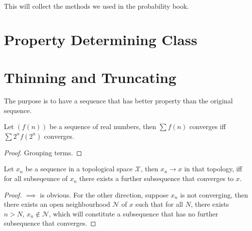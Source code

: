 This will collect the methods we used in the probability book.

\section{Property Determining Class}

\begin{method}
    
\end{method}

\begin{method}
    
\end{method}

\begin{method}
    
\end{method}


\begin{method}
    
\end{method}

\begin{method}
    
\end{method}

\section{Thinning and Truncating}

The purpose is to have a sequence that has better property than the original sequence. 

\begin{method}
    Let \((f(n))\) be a  sequence of real numbers, then \(\sum f(n)\) converges iff \(\sum 2^{n} f(2^{n})\) converges.
\end{method}
\begin{proof}
    Grouping terms. 
\end{proof}

\begin{method}\label{method:thin-topology}
    Let \(x_{n}\) be a sequence in a topological space \(\mathcal{X}\), then \(x_{n} \to x\) in that topology, iff for all subseqeunce of \(x_{n}\) there exists a further subsequence that converges to \(x\).
\end{method}
\begin{proof}
    \(\implies\) is obvious. For the other direction, suppose \(x_{n}\) is not converging, then there exists an open neighbourhood \(\mathcal{N}\) of \(x\) such that for all \(N\), there exists \(n>N\), \(x_{n} \notin \mathcal{N}\), which will constitute a subsequence that has no further subsequence that converges.
\end{proof}

